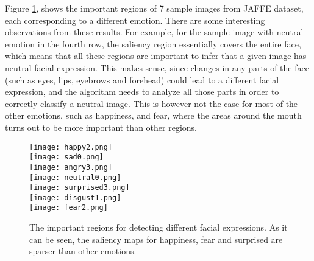 \documentclass[conference]{IEEEtran}
\begin{document}
Figure \ref{fig:SaliencyJAFFE}, shows the important regions of 7 sample images from JAFFE dataset, each corresponding to a different emotion.
There are some interesting observations from these results. 
For example, for the sample image with neutral emotion in the fourth row, the saliency region essentially covers the entire face, which means that all these regions are important to infer that a given image has neutral facial expression. 
This makes sense, since changes in any parts of the face (such as eyes, lips, eyebrows and forehead) could lead to a different facial expression, and the algorithm needs to analyze all those parts in order to correctly classify a neutral image.
This is however not the case for most of the other emotions, such as happiness, and fear, where the areas around the mouth turns out to be more important than other regions.
\begin{figure}[H]
\begin{center}
   \texttt{[image: happy2.png]}  \\ \vspace{0.05cm}
   \texttt{[image: sad0.png]}  \\ \vspace{0.05cm}
   \texttt{[image: angry3.png]}  \\ \vspace{0.06cm}
   \texttt{[image: neutral0.png]}  \\ \vspace{0.09cm}
    \texttt{[image: surprised3.png]}  \\ \vspace{0.1cm}
    \texttt{[image: disgust1.png]}  \\ \vspace{0.12cm}
    \texttt{[image: fear2.png]}  \\
\end{center}
   \caption{The important regions for detecting different facial expressions. As it can be seen, the saliency maps for happiness, fear and surprised are sparser than other emotions.}
\label{fig:SaliencyJAFFE}
\end{figure}
\end{document}
